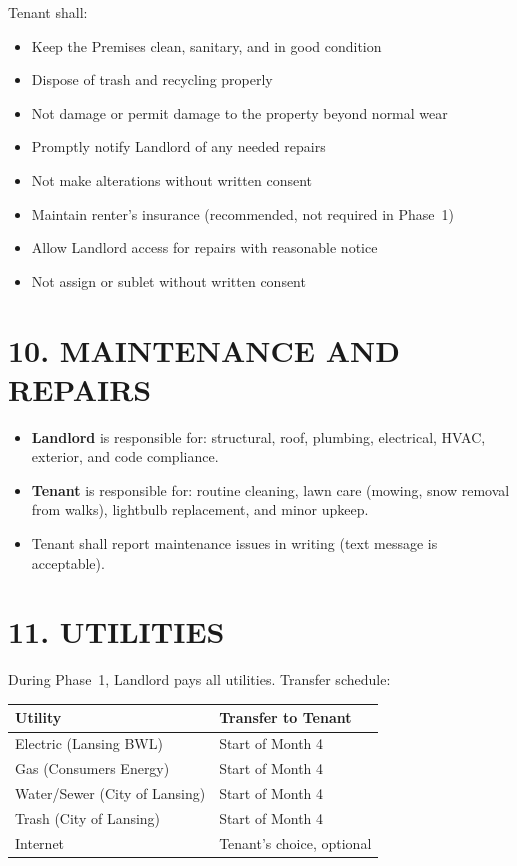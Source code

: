 \documentclass[11pt]{article}
\begin{document}
Tenant shall:

\begin{itemize}[nosep]
\item Keep the Premises clean, sanitary, and in good condition
\item Dispose of trash and recycling properly
\item Not damage or permit damage to the property beyond normal wear
\item Promptly notify Landlord of any needed repairs
\item Not make alterations without written consent
\item Maintain renter's insurance (recommended, not required in Phase~1)
\item Allow Landlord access for repairs with reasonable notice
\item Not assign or sublet without written consent
\end{itemize}

\section{10. MAINTENANCE AND REPAIRS}

\begin{itemize}[nosep]
\item \textbf{Landlord} is responsible for: structural, roof, plumbing,
  electrical, HVAC, exterior, and code compliance.
\item \textbf{Tenant} is responsible for: routine cleaning, lawn care
  (mowing, snow removal from walks), lightbulb replacement, and minor
  upkeep.
\item Tenant shall report maintenance issues in writing (text message
  is acceptable).
\end{itemize}

\section{11. UTILITIES}

During Phase~1, Landlord pays all utilities. Transfer schedule:

\begin{tabular}{ll}
\toprule
Utility & Transfer to Tenant \\
\midrule
Electric (Lansing BWL) & Start of Month 4 \\
Gas (Consumers Energy) & Start of Month 4 \\
Water/Sewer (City of Lansing) & Start of Month 4 \\
Trash (City of Lansing) & Start of Month 4 \\
Internet & Tenant's choice, optional \\
\bottomrule
\end{tabular}
\end{document}
